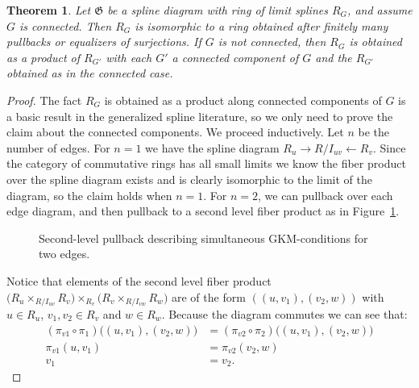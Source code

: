 \documentclass{article}
\newtheorem{theorem}{Theorem}
\begin{document}
\begin{theorem}
\label{thm:iterated-pullback}
Let $\mathfrak G$ be a spline diagram with ring of limit splines $R_{G}$, and assume $G$ is connected. Then $R_{G}$ is isomorphic to a ring obtained after finitely many pullbacks or equalizers of surjections. If $G$ is not connected, then $R_{G}$ is obtained as a product of $R_{G'}$ with each $G'$ a connected component of $G$ and the $R_{G'}$ obtained as in the connected case.
\end{theorem}
\begin{proof}
The fact $R_{G}$ is obtained as a product along connected components of $G$ is a basic result in the generalized spline literature, so we only need to prove the claim about the connected components. We proceed inductively. Let $n$ be the number of edges. For $n=1$ we have the spline diagram $R_u \rightarrow R/I_{uv} \leftarrow R_v$. Since the category of commutative rings has all small limits we know the fiber product over the spline diagram exists and is clearly isomorphic to the limit of the diagram, so the claim holds when $n=1$. For $n=2$, we can pullback over each edge diagram, and then pullback to a second level fiber product as in Figure~\ref{fig:second-level-pullback}.

\begin{figure}
\centering
{}
\caption{Second-level pullback describing simultaneous GKM-conditions for two edges.}
\label{fig:second-level-pullback}
\end{figure}

Notice that elements of the second level fiber product $\bigl(R_u \times_{R/I_{uv}} R_v\bigr)\! \times_{R_v}\! \bigl(R_v \times_{R/I_{vw}} R_w\bigr)$ are of the form $((u,v_1), (v_2, w))$  with $u \in R_u$, $v_1, v_2 \in R_v$ and $w \in R_w$. Because the diagram commutes we can see that:
\begin{align*}
    (\pi_{v1} \circ \pi_1)\bigl((u,v_1), (v_2, w)\bigr)
      &= (\pi_{v2} \circ \pi_2)\bigl((u,v_1), (v_2, w)\bigr) \\
    \pi_{v1}(u,v_1) &= \pi_{v2}(v_2, w) \\
    v_1 &= v_2.
\end{align*}


\end{proof}
\end{document}
